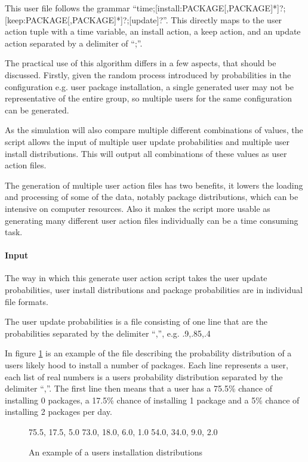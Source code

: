 This user file follows the grammar ``time;[install:PACKAGE[,PACKAGE]*]?;[keep:PACKAGE[,PACKAGE]*]?;[update]?''.
This directly maps to the user action tuple with a time variable, an install action, a keep action, and an update action separated by a delimiter of ``;''.

The practical use of this algorithm differs in a few aspects, that should be discussed.
Firstly, given the random process introduced by probabilities in the configuration e.g. user package installation,
a single generated user may not be representative of the entire group, so multiple users for the same configuration can be generated.

As the simulation will also compare multiple different combinations of values, the script allows the input of multiple user update probabilities and multiple user install distributions.
This will output all combinations of these values as user action files.

The generation of multiple user action files has two benefits, it lowers the loading and processing of some of the data, notably package distributions, which can be intensive on computer resources.
Also it makes the script more usable as generating many different user action files individually can be a time consuming task.

\paragraph{Input}
The way in which this generate user action script takes the user update probabilities, user install distributions and package probabilities are in individual file formats.

The user update probabilities is a file consisting of one line that are the probabilities separated by the delimiter ``,'', e.g. .9,.85,.4

In figure \ref{userprob} is an example of the file describing the probability distribution of a users likely hood to install a number of packages.
Each line represents a user, each list of real numbers is a users probability distribution separated by the delimiter ``,''.
The first line then means that a user has a 75.5\% chance of installing 0 packages, a 17.5\% chance of installing 1 package and a 5\% chance of installing 2 packages per day.

\begin{figure}[htp]
\begin{center}
75.5, 17.5, 5.0
73.0, 18.0, 6.0, 1.0
54.0, 34.0, 9.0, 2.0
\caption[Install Distribution Example File]{An example of a users installation distributions}
\label{userprob}
\end{center}
\end{figure}

